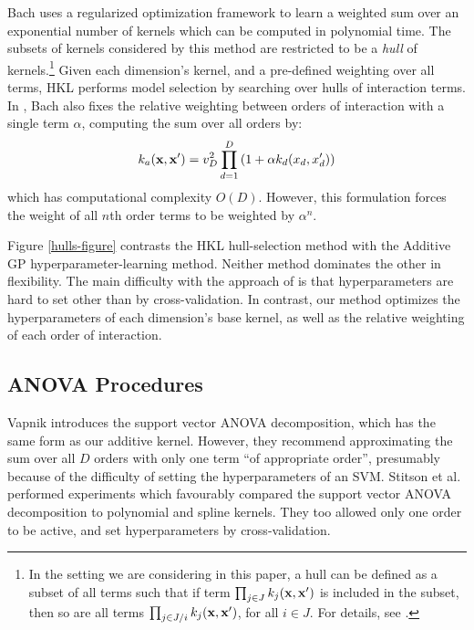 Bach\cite{DBLP:journals/corr/abs-0909-0844} uses a regularized optimization framework to learn a weighted sum over an exponential number of kernels which can be computed in polynomial time.  The subsets of kernels considered by this method are restricted to be a \textit{hull} of kernels.\footnote{In the setting we are considering in this paper, a hull can be defined as a subset of all terms such that if term $\prod_{j \in J} k_j(\bf x, x')$ is included in the subset, then so are all terms $\prod_{j \in J / i} k_j(\bf x, x')$, for all $i \in J$.  For details, see \cite{DBLP:journals/corr/abs-0909-0844}.}
Given each dimension's kernel, and a pre-defined weighting over all terms, HKL performs model selection by searching over hulls of interaction terms.
In \cite{DBLP:journals/corr/abs-0909-0844}, Bach also fixes the relative weighting between orders of interaction with a single term $\alpha$, computing the sum over all orders by:
\begin{equation}
\label{eqn:uniform}
k_{a}({\bf x, x'}) = v_D^2 \prod_{d=1}^D \left(1 + \alpha k_{d}(x_{d}, x_{d}') \right)
\end{equation}
which has computational complexity $O(D)$.  However, this formulation forces the weight of all $n$th order terms to be weighted by $\alpha^n$.

Figure \ref{hulls-figure} contrasts the HKL hull-selection method with the Additive GP hyperparameter-learning method. Neither method dominates the other in flexibility.  The main difficulty with the approach of \cite{DBLP:journals/corr/abs-0909-0844} is that hyperparameters are hard to set other than by cross-validation.  In contrast, our method optimizes the hyperparameters of each dimension's base kernel, as well as the relative weighting of each order of interaction. 


\subsection{ANOVA Procedures}

Vapnik \cite{vapnik1998statistical} introduces the support vector ANOVA decomposition, which has the same form as our additive kernel.  However, they recommend approximating the sum over all $D$ orders with only one term ``of appropriate order'', presumably because of the difficulty of setting the hyperparameters of an SVM. Stitson et al.\cite{stitson1999support} performed experiments which favourably compared the support vector ANOVA decomposition to polynomial and spline kernels.  They too allowed only one order to be active, and set hyperparameters by cross-validation.
%

